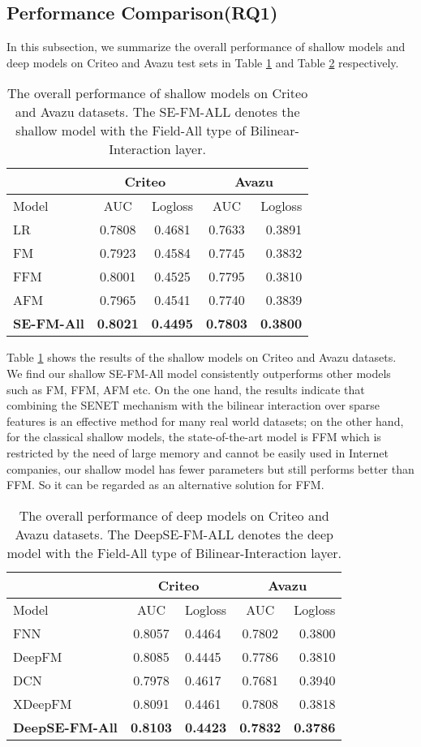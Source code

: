 \documentclass[sigconf]{acmart}
\begin{document}
\subsection{Performance Comparison(RQ1)}
In this subsection, we summarize the overall performance of shallow
models and deep models on Criteo and Avazu test sets in Table \ref{table:t1} and Table \ref{table:t2} respectively.


\begin{table}[!htp]
  \caption{The overall performance of shallow models on Criteo and
Avazu datasets. The SE-FM-ALL denotes the shallow model with the
Field-All type of Bilinear-Interaction layer.}
  \label{table:t1}
  \begin{tabular}{lcccr}
    \toprule
     &\multicolumn{2}{c}{Criteo}&\multicolumn{2}{c}{Avazu}\\
    \hline
     Model & AUC & Logloss & AUC & Logloss\\
    \midrule
LR & 0.7808 & 0.4681 & 0.7633 & 0.3891\tabularnewline
FM & 0.7923 & 0.4584 & 0.7745 & 0.3832\tabularnewline
FFM & 0.8001 & 0.4525 & 0.7795 & 0.3810\tabularnewline
AFM & 0.7965 & 0.4541 & 0.7740 & 0.3839\tabularnewline
\textbf{SE-FM-All} & \textbf{0.8021} & \textbf{0.4495} &
\textbf{0.7803} & \textbf{0.3800}\tabularnewline
  \bottomrule
\end{tabular}
\end{table}

Table \ref{table:t1} shows the results of the shallow models on Criteo and Avazu
datasets. We find our shallow SE-FM-All model consistently
outperforms other models such as FM, FFM, AFM etc. On the one hand, the
results indicate that combining the SENET
mechanism with the bilinear interaction over sparse features is an
effective method for many real world datasets; on the other hand, for the classical shallow models,
the state-of-the-art model is FFM which is restricted by the need of large memory
and cannot be easily used in Internet companies, our shallow model has
fewer parameters but still performs better than FFM. So it can be
regarded as an alternative solution for FFM.


\begin{table}[!htp]
  \caption{The overall performance of deep models on Criteo and
Avazu datasets. The DeepSE-FM-ALL denotes the deep model with the
Field-All type of Bilinear-Interaction layer.}
  \label{table:t2}
  \begin{tabular}{lclcr}
    \toprule
     &\multicolumn{2}{c}{Criteo}&\multicolumn{2}{c}{Avazu}\\
    \hline
     Model& AUC & Logloss & AUC & Logloss\\
    \midrule
FNN & 0.8057 & 0.4464 & 0.7802 & 0.3800\tabularnewline
DeepFM & 0.8085 & 0.4445 & 0.7786 & 0.3810\tabularnewline
DCN & 0.7978 & 0.4617 & 0.7681 & 0.3940\tabularnewline
XDeepFM & 0.8091 & 0.4461 & 0.7808 & 0.3818\tabularnewline
\textbf{DeepSE-FM-All} & \textbf{0.8103} & \textbf{0.4423} &
\textbf{0.7832} & \textbf{0.3786}\tabularnewline
  \bottomrule
\end{tabular}
\end{table}
\end{document}
